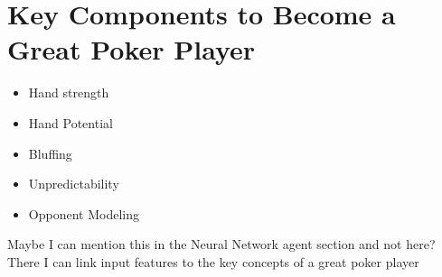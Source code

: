 \section{Key Components to Become a Great Poker Player}
\begin{itemize}
\item Hand strength
\item Hand Potential
\item Bluffing
\item Unpredictability
\item Opponent Modeling
\end{itemize}
Maybe I can mention this in the Neural Network agent section and not here? There I can link input features to the key concepts of a great poker player
